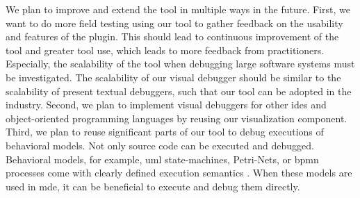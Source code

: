 \documentclass[conference]{IEEEtran}
\begin{document}
We plan to improve and extend the tool in multiple ways in the future.
First, we want to do more field testing using our tool to gather feedback on the usability and features of the plugin.
This should lead to continuous improvement of the tool and greater tool use, which leads to more feedback from practitioners. 
Especially, the scalability of the tool when debugging large software systems must be investigated.
The scalability of our visual debugger should be similar to the scalability of present textual debuggers, such that our tool can be adopted in the industry.
Second, we plan to implement visual debuggers for other \glspl*{ide} and object-oriented programming languages by reusing our visualization component.
Third, we plan to reuse significant parts of our tool to debug executions of behavioral models.
Not only source code can be executed and debugged.
Behavioral models, for example, \gls*{uml} state-machines, Petri-Nets, or \gls{bpmn} processes come with clearly defined execution semantics \cite{krauterBehavioralConsistencyHeterogeneous2021}.
When these models are used in \gls*{mde}, it can be beneficial to execute and debug them directly.



\newpage



\end{document}
